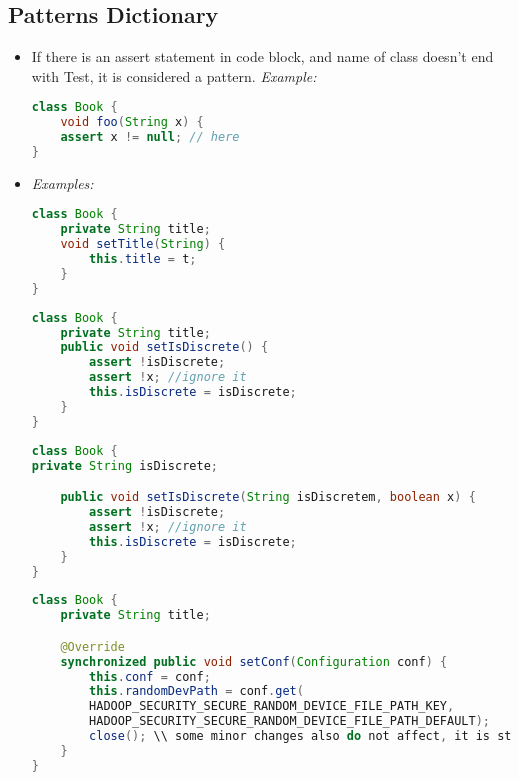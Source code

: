 
\subsection*{Patterns Dictionary}

\begin{itemize}
	\item {}
	{If there is an assert statement in code block, and name of class doesn't end with Test, it is considered a pattern.}
	{\it Example:}
\begin{lstlisting}[language=Java]
class Book {
	void foo(String x) {
	assert x != null; // here
}
\end{lstlisting}

	\item {}
	{\it Examples:}
\begin{lstlisting}[language=Java]
class Book {
	private String title;
	void setTitle(String) {
		this.title = t;
	}
}
\end{lstlisting}

\begin{lstlisting}[language=Java]
class Book {
	private String title;
	public void setIsDiscrete() {
		assert !isDiscrete;
		assert !x; //ignore it
		this.isDiscrete = isDiscrete;
	}
}
\end{lstlisting}

\begin{lstlisting}[language=Java]
class Book {
private String isDiscrete;

	public void setIsDiscrete(String isDiscretem, boolean x) {
		assert !isDiscrete;
		assert !x; //ignore it
		this.isDiscrete = isDiscrete;
	}
}
\end{lstlisting}

\begin{lstlisting}[language=Java]
class Book {
	private String title;

	@Override
	synchronized public void setConf(Configuration conf) {
		this.conf = conf;
		this.randomDevPath = conf.get(
		HADOOP_SECURITY_SECURE_RANDOM_DEVICE_FILE_PATH_KEY,
		HADOOP_SECURITY_SECURE_RANDOM_DEVICE_FILE_PATH_DEFAULT);
		close(); \\ some minor changes also do not affect, it is still Setter pattern
	}
}
\end{lstlisting}


\end{itemize}
